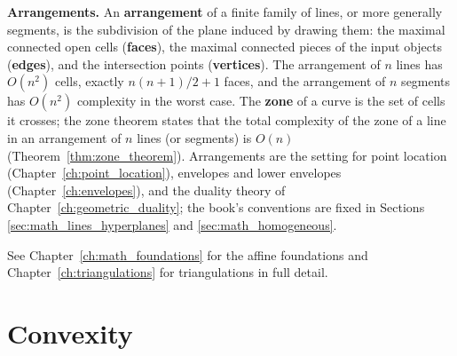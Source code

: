 \medskip
\noindent\textbf{Arrangements.}
An \textbf{arrangement} of a finite family of lines, or more generally
segments, is the subdivision of the plane induced by drawing them: the
maximal connected open cells (\textbf{faces}), the maximal connected pieces
of the input objects (\textbf{edges}), and the intersection points
(\textbf{vertices}). The arrangement of $n$ lines has
$O(n^2)$ cells, exactly $n(n+1)/2 + 1$ faces, and the arrangement of $n$
segments has $O(n^2)$ complexity in the worst case. The \textbf{zone} of a
curve is the set of cells it crosses; the zone theorem states that the total
complexity of the zone of a line in an arrangement of $n$ lines (or segments)
is $O(n)$ (Theorem~\ref{thm:zone_theorem}). Arrangements are the setting for
point location (Chapter~\ref{ch:point_location}), envelopes and lower
envelopes (Chapter~\ref{ch:envelopes}), and the duality theory of
Chapter~\ref{ch:geometric_duality}; the book's conventions are fixed in
Sections \ref{sec:math_lines_hyperplanes} and \ref{sec:math_homogeneous}.

See Chapter~\ref{ch:math_foundations} for the affine foundations and
Chapter~\ref{ch:triangulations} for triangulations in full detail.

\section{Convexity}
\label{sec:app_math_convexity}

